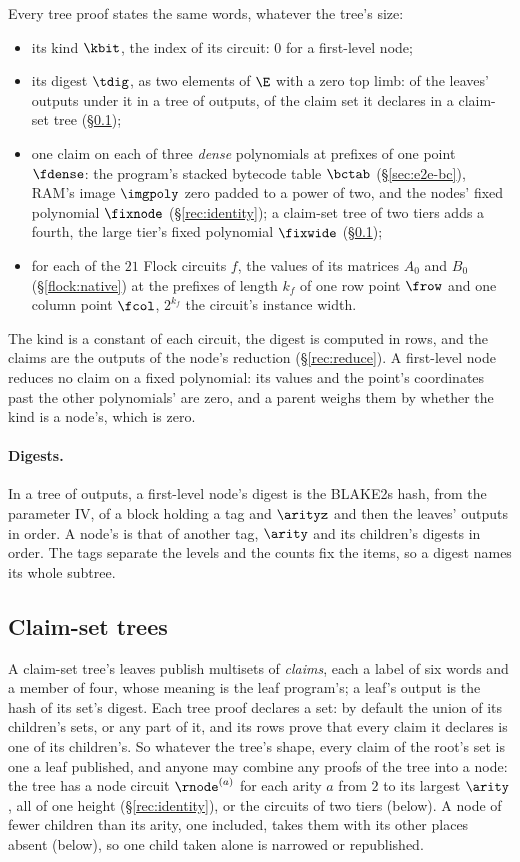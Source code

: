 Every tree proof states the same words, whatever the tree's size:
\begin{itemize}[itemsep=1pt,topsep=3pt]
\item its kind $\kbit$, the index of its circuit: $0$ for a first-level node;
\item its digest $\tdig$, as two elements of $\E$ with a zero top limb: of the leaves' outputs under it in a tree of outputs, of the claim set it declares in a claim-set tree (\S\ref{rec:claimsets});
\item one claim on each of three \emph{dense} polynomials at prefixes of one point $\fdense$: the program's stacked bytecode table $\bctab$ (\S\ref{sec:e2e-bc}), RAM's image $\imgpoly$ zero padded to a power of two, and the nodes' fixed polynomial $\fixnode$ (\S\ref{rec:identity}); a claim-set tree of two tiers adds a fourth, the large tier's fixed polynomial $\fixwide$ (\S\ref{rec:claimsets});
\item for each of the $21$ Flock circuits $f$, the values of its matrices $A_0$ and $B_0$ (\S\ref{flock:native}) at the prefixes of length $k_f$ of one row point $\frow$ and one column point $\fcol$, $2^{k_f}$ the circuit's instance width.
\end{itemize}
The kind is a constant of each circuit, the digest is computed in rows, and the claims are the outputs of the node's reduction (\S\ref{rec:reduce}). A first-level node reduces no claim on a fixed polynomial: its values and the point's coordinates past the other polynomials' are zero, and a parent weighs them by whether the kind is a node's, which is zero.

\paragraph{Digests.} In a tree of outputs, a first-level node's digest is the BLAKE2s hash, from the parameter IV, of a block holding a tag and $\arityz$ and then the leaves' outputs in order. A node's is that of another tag, $\arity$ and its children's digests in order. The tags separate the levels and the counts fix the items, so a digest names its whole subtree.

\subsection{Claim-set trees}\label{rec:claimsets}

A claim-set tree's leaves publish multisets of \emph{claims}, each a label of six words and a member of four, whose meaning is the leaf program's; a leaf's output is the hash of its set's digest. Each tree proof declares a set: by default the union of its children's sets, or any part of it, and its rows prove that every claim it declares is one of its children's. So whatever the tree's shape, every claim of the root's set is one a leaf published, and anyone may combine any proofs of the tree into a node: the tree has a node circuit $\rnode^{(a)}$ for each arity $a$ from $2$ to its largest $\arity$, all of one height (\S\ref{rec:identity}), or the circuits of two tiers (below). A node of fewer children than its arity, one included, takes them with its other places absent (below), so one child taken alone is narrowed or republished.


